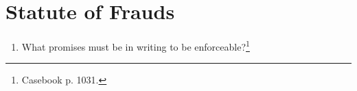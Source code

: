 \section{Statute of Frauds}

\begin{enumerate}
    \item What promises must be in writing to be 
    enforceable?\footnote{Casebook p. 1031.}
\end{enumerate}
